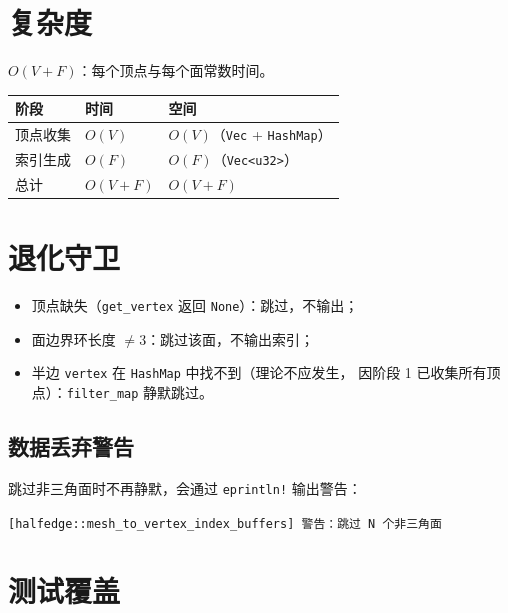 \documentclass[11pt,a4paper]{article}
\begin{document}
\section{复杂度}

$O(V + F)$：每个顶点与每个面常数时间。

\begin{center}
\renewcommand{\arraystretch}{1.18}
\begin{tabular}{@{}lll@{}}
  \toprule
  \textbf{阶段} & \textbf{时间} & \textbf{空间} \\
  \midrule
  顶点收集 & $O(V)$ & $O(V)$（\texttt{Vec} + \texttt{HashMap}） \\
  索引生成 & $O(F)$ & $O(F)$（\texttt{Vec<u32>}） \\
  总计     & $O(V + F)$ & $O(V + F)$ \\
  \bottomrule
\end{tabular}
\end{center}

\section{退化守卫}

\begin{itemize}
  \item 顶点缺失（\texttt{get\_vertex} 返回 \texttt{None}）：跳过，不输出；
  \item 面边界环长度 $\ne 3$：跳过该面，不输出索引；
  \item 半边 \texttt{vertex} 在 \texttt{HashMap} 中找不到（理论不应发生，
        因阶段 1 已收集所有顶点）：\texttt{filter\_map} 静默跳过。
\end{itemize}

\subsection{数据丢弃警告}

跳过非三角面时不再静默，会通过 \texttt{eprintln!} 输出警告：
\begin{center}
\texttt{[halfedge::mesh\_to\_vertex\_index\_buffers] 警告：跳过 N 个非三角面}
\end{center}

\section{测试覆盖}
\end{document}
